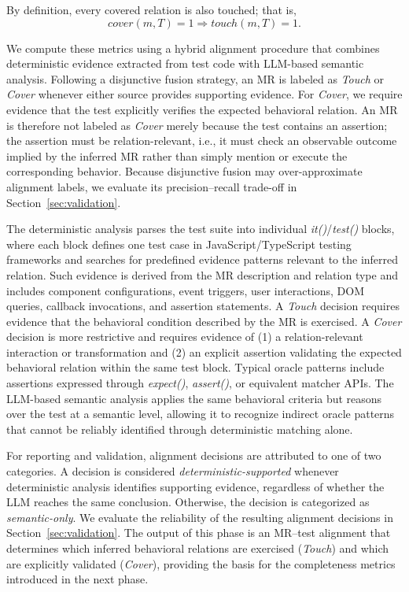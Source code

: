By definition, every covered relation is also touched; that is,
\[
cover(m,T)=1 \Rightarrow touch(m,T)=1.
\]

We compute these metrics using a hybrid alignment procedure that combines deterministic evidence extracted from test code with LLM-based semantic analysis. Following a disjunctive fusion strategy, an MR is labeled as \textit{Touch} or \textit{Cover} whenever either source provides supporting evidence. For \textit{Cover}, we require evidence that the test explicitly verifies the expected behavioral relation. An MR is therefore not labeled as \textit{Cover} merely because the test contains an assertion; the assertion must be relation-relevant, i.e., it must check an observable outcome implied by the inferred MR rather than simply mention or execute the corresponding behavior. Because disjunctive fusion may over-approximate alignment labels, we evaluate its precision--recall trade-off in Section~\ref{sec:validation}.

The deterministic analysis parses the test suite into individual \textit{it()}/\textit{test()} blocks, where each block defines one test case in JavaScript/TypeScript testing frameworks and searches for predefined evidence patterns relevant to the inferred relation. Such evidence is derived from the MR description and relation type and includes component configurations, event triggers, user interactions, DOM queries, callback invocations, and assertion statements.
A \textit{Touch} decision requires evidence that the behavioral condition described by the MR is exercised. A \textit{Cover} decision is more restrictive and requires evidence of (1) a relation-relevant interaction or transformation and (2) an explicit assertion validating the expected behavioral relation within the same test block. Typical oracle patterns include assertions expressed through \textit{expect()}, \textit{assert()}, or equivalent matcher APIs. The LLM-based semantic analysis applies the same behavioral criteria but reasons over the test at a semantic level, allowing it to recognize indirect oracle patterns that cannot be reliably identified through deterministic matching alone. 

For reporting and validation, alignment decisions are attributed to one of two categories. A decision is considered \textit{deterministic-supported} whenever deterministic analysis identifies supporting evidence, regardless of whether the LLM reaches the same conclusion. Otherwise, the decision is categorized as \textit{semantic-only}. 
We evaluate the reliability of the resulting alignment decisions in Section~\ref{sec:validation}. 
The output of this phase is an MR--test alignment that determines which inferred behavioral relations are exercised (\textit{Touch}) and which are explicitly validated (\textit{Cover}), providing the basis for the completeness metrics introduced in the next phase.


